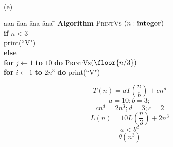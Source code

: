 \begin{problem}
\bigskip
\ 


\bigskip
\noindent
(e)\ \ 
\begin{minipage}[t]{3in}
\begin{tabbing}
aaa \= aaa \= aaa \= aaa \=  \kill
\textbf{Algorithm} \textsc{PrintVs} $(n: \mbox{\bf integer})$ \\
          \> \textbf{if} $n < 3$ \\
          \>\>  print(``V") \\
          \>\textbf{else} \\
          \>\>  \textbf{for} $j \leftarrow 1$ \textbf{to} $10$ 
					\textbf{do} \textsc{PrintVs}$(\floor{n/3})$\\
      \>\> \textbf{for} $i \leftarrow 1$ \textbf{to} $2n^3$ \textbf{do} print(``V")
\end{tabbing}
\end{minipage}

\begin{solution}
\[ T(n) = aT( \frac{n}{b} ) + cn^{d} \]
\[ a = 10; b = 3; \]
\[ cn^{d} = 2n^{3}; d = 3; c = 2 \]
\[ L(n) = 10L( \frac{n}{3} ) + 2n^{3} \]
\[ a < b^{d} \]
\[ \theta(n^{3}) \]
\end{solution}


\bigskip
\


\end{problem}


